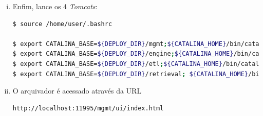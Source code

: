 \begin {enumerate}[i.]
E executamos:

\begin{lstlisting}[language=bash, style=nonumbers]
$ source /home/user/.bashrc

pushd ${DEPLOY_DIR}/mgmt/webapps && rm -rf mgmt*; cp ${WARSRC_DIR}/mgmt.war .; mkdir mgmt; cd mgmt; jar xf ../mgmt.war; popd; 
pushd ${DEPLOY_DIR}/engine/webapps && rm -rf engine*; cp ${WARSRC_DIR}/engine.war .; mkdir engine; cd engine; jar xf ../engine.war; popd; 
pushd ${DEPLOY_DIR}/etl/webapps && rm -rf etl*; cp ${WARSRC_DIR}/etl.war .; mkdir etl; cd etl; jar xf ../etl.war; popd; 
pushd ${DEPLOY_DIR}/retrieval/webapps && rm -rf retrieval*; cp ${WARSRC_DIR}/retrieval.war .; mkdir retrieval; cd retrieval; jar xf ../retrieval.war; popd;

\end{lstlisting}

\item Enfim, lance os 4 \textit{Tomcats}:

\begin{lstlisting}[language=bash, style=nonumbers]
$ source /home/user/.bashrc

$ export CATALINA_BASE=${DEPLOY_DIR}/mgmt;${CATALINA_HOME}/bin/catalina.sh start 
$ export CATALINA_BASE=${DEPLOY_DIR}/engine;${CATALINA_HOME}/bin/catalina.sh start 
$ export CATALINA_BASE=${DEPLOY_DIR}/etl;${CATALINA_HOME}/bin/catalina.sh start 
$ export CATALINA_BASE=${DEPLOY_DIR}/retrieval; ${CATALINA_HOME}/bin/catalina.sh start

\end{lstlisting}

\item O arquivador é acessado através da URL 

\begin{lstlisting}[language=bash, style=nonumbers]
http://localhost:11995/mgmt/ui/index.html
\end{lstlisting}

\end{enumerate} 
